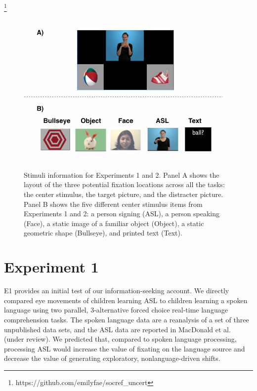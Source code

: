 \documentclass[10pt, letterpaper]{article}
\newenvironment{CodeChunk}{}{}
\begin{document}
\footnote{https://github.com/emilyfae/socref\_uncert}

\begin{CodeChunk}
\begin{figure}[t]

{\centering \includegraphics{figs/e1_stimuli-1} 

}

\caption[Stimuli information for Experiments 1 and 2]{Stimuli information for Experiments 1 and 2. Panel A shows the layout of the three potential fixation locations across all the tasks: the center stimulus, the target picture, and the distracter picture. Panel B shows the five different center stimulus items from Experiments 1 and 2: a person signing (ASL), a person speaking (Face), a static image of a familiar object (Object), a static geometric shape (Bullseye), and printed text (Text).}\label{fig:e1_stimuli}
\end{figure}
\end{CodeChunk}

\section{Experiment 1}\label{experiment-1}

E1 provides an initial test of our information-seeking account. We
directly compared eye movements of children learning ASL to children
learning a spoken language using two parallel, 3-alternative forced
choice real-time language comprehension tasks. The spoken language data
are a reanalysis of a set of three unpublished data sets, and the ASL
data are reported in MacDonald et al. (under review). We predicted that,
compared to spoken language processing, processing ASL would increase
the value of fixating on the language source and decrease the value of
generating exploratory, nonlanguage-driven shifts.
\end{document}
